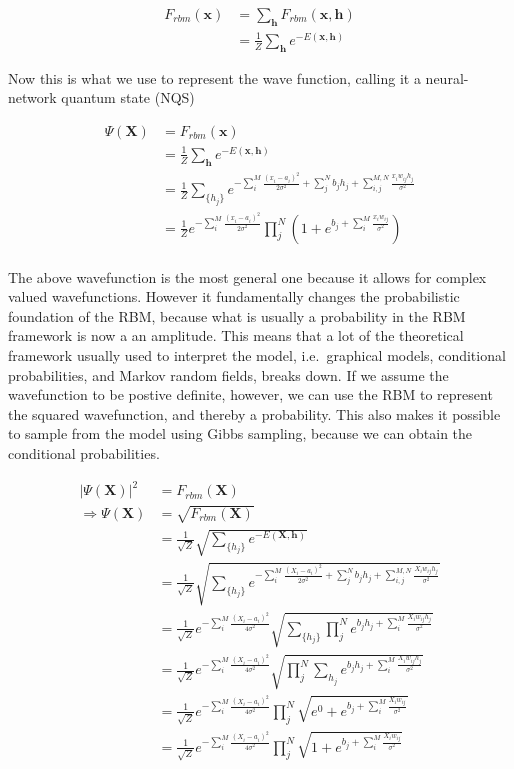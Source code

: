 \documentclass[%
oneside,                 %
final,                   %
10pt]{article}
\begin{document}
\begin{align}
	F_{rbm}(\mathbf{x}) &= \sum_\mathbf{h} F_{rbm}(\mathbf{x}, \mathbf{h}) \\
				&= \frac{1}{Z}\sum_\mathbf{h} e^{-E(\mathbf{x}, \mathbf{h})}
\end{align}

Now this is what we use to represent the wave function, calling it a neural-network quantum state (NQS)

\begin{align}
	\Psi (\mathbf{X}) &= F_{rbm}(\mathbf{x}) \\
	&= \frac{1}{Z}\sum_{\bm{h}} e^{-E(\mathbf{x}, \mathbf{h})} \\
	&= \frac{1}{Z} \sum_{\{h_j\}} e^{-\sum_i^M \frac{(x_i - a_i)^2}{2\sigma^2} + \sum_j^N b_j h_j + \sum_{i,j}^{M,N} \frac{x_i w_{ij} h_j}{\sigma^2}} \\
	&= \frac{1}{Z} e^{-\sum_i^M \frac{(x_i - a_i)^2}{2\sigma^2}} \prod_j^N (1 + e^{b_j + \sum_i^M \frac{x_i w_{ij}}{\sigma^2}}) \\
\end{align}

The above wavefunction is the most general one because it allows for
complex valued wavefunctions. However it fundamentally changes the
probabilistic foundation of the RBM, because what is usually a
probability in the RBM framework is now a an amplitude. This means
that a lot of the theoretical framework usually used to interpret the
model, i.e.~graphical models, conditional probabilities, and Markov
random fields, breaks down. If we assume the wavefunction to be
postive definite, however, we can use the RBM to represent the squared
wavefunction, and thereby a probability. This also makes it possible
to sample from the model using Gibbs sampling, because we can obtain
the conditional probabilities.

\begin{align}
	|\Psi (\mathbf{X})|^2 &= F_{rbm}(\mathbf{X}) \\
	\Rightarrow \Psi (\mathbf{X}) &= \sqrt{F_{rbm}(\mathbf{X})} \\
	&= \frac{1}{\sqrt{Z}}\sqrt{\sum_{\{h_j\}} e^{-E(\mathbf{X}, \mathbf{h})}} \\
	&= \frac{1}{\sqrt{Z}} \sqrt{\sum_{\{h_j\}} e^{-\sum_i^M \frac{(X_i - a_i)^2}{2\sigma^2} + \sum_j^N b_j h_j + \sum_{i,j}^{M,N} \frac{X_i w_{ij} h_j}{\sigma^2}} }\\
	&= \frac{1}{\sqrt{Z}} e^{-\sum_i^M \frac{(X_i - a_i)^2}{4\sigma^2}} \sqrt{\sum_{\{h_j\}} \prod_j^N e^{b_j h_j + \sum_i^M \frac{X_i w_{ij} h_j}{\sigma^2}}} \\
	&= \frac{1}{\sqrt{Z}} e^{-\sum_i^M \frac{(X_i - a_i)^2}{4\sigma^2}} \sqrt{\prod_j^N \sum_{h_j}  e^{b_j h_j + \sum_i^M \frac{X_i w_{ij} h_j}{\sigma^2}}} \\
	&= \frac{1}{\sqrt{Z}} e^{-\sum_i^M \frac{(X_i - a_i)^2}{4\sigma^2}} \prod_j^N \sqrt{e^0 + e^{b_j + \sum_i^M \frac{X_i w_{ij}}{\sigma^2}}} \\
	&= \frac{1}{\sqrt{Z}} e^{-\sum_i^M \frac{(X_i - a_i)^2}{4\sigma^2}} \prod_j^N \sqrt{1 + e^{b_j + \sum_i^M \frac{X_i w_{ij}}{\sigma^2}}} \\
\end{align}
\end{document}
